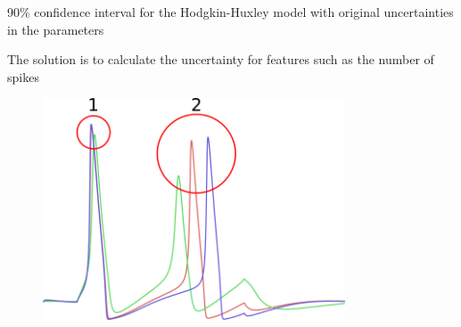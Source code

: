 \documentclass[presentation]{beamer}
\begin{document}
\begin{frame}{90\% confidence interval for the Hodgkin-Huxley model with original uncertainties in the parameters}
   \vspace{-5mm}
\begin{figure}
\end{figure}
\end{frame}


\begin{frame}{The solution is to calculate the uncertainty for features such as the number of spikes}
\vspace{-5mm}
\begin{figure}
   \includegraphics[width=0.8\textwidth]{hh_thin_extract_nrSpikes.png}
\end{figure}
\end{frame}
\end{document}
